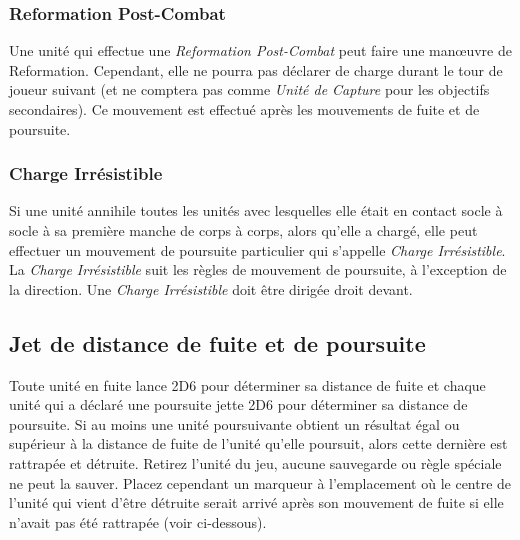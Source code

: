 \subsubsection*{}

\subsubsection*{Reformation Post-Combat}
Une unité qui effectue une \emph{Reformation Post-Combat} peut faire une manœuvre de Reformation. Cependant, elle ne pourra pas déclarer de charge durant le tour de joueur suivant (et ne comptera pas comme \emph{Unité de Capture} pour les objectifs secondaires). Ce mouvement est effectué après les mouvements de fuite et de poursuite.

\subsubsection*{Charge Irrésistible}
Si une unité annihile toutes les unités avec lesquelles elle était en contact socle à socle à sa première manche de corps à corps, alors qu'elle a chargé, elle peut effectuer un mouvement de poursuite particulier qui s'appelle \emph{Charge Irrésistible}. La \emph{Charge Irrésistible} suit les règles de mouvement de poursuite, à l'exception de la direction. Une \emph{Charge Irrésistible} doit être dirigée droit devant.

\subsection*{Jet de distance de fuite et de poursuite}

Toute unité en fuite lance 2D6 pour déterminer sa distance de fuite et chaque unité qui a déclaré une poursuite jette 2D6 pour déterminer sa distance de poursuite. Si au moins une unité poursuivante obtient un résultat égal ou supérieur à la distance de fuite de l'unité qu'elle poursuit, alors cette dernière est rattrapée et détruite. Retirez l'unité du jeu, aucune sauvegarde ou règle spéciale ne peut la sauver. Placez cependant un marqueur à l'emplacement où le centre de l'unité qui vient d'être détruite serait arrivé après son mouvement de fuite si elle n'avait pas été rattrapée (voir ci-dessous).

